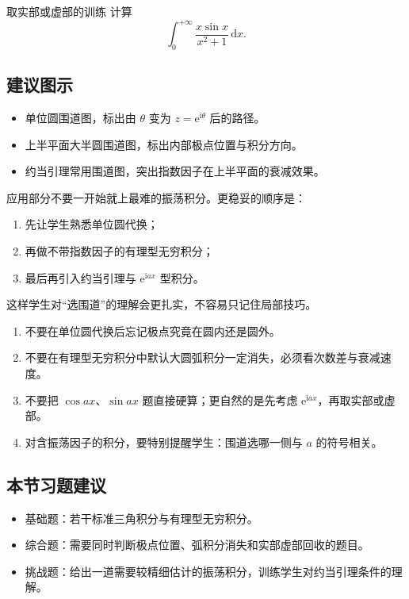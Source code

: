 \begin{lizi}{取实部或虚部的训练}{}
计算
\[
    \int_0^{+\infty}\frac{x\sin x}{x^2+1}\,\mathrm{d}x.
\]
\end{lizi}

\subsection*{建议图示}
\begin{itemize}
    \item 单位圆围道图，标出由 $\theta$ 变为 $z=\mathrm{e}^{\mathrm{i}\theta}$ 后的路径。
    \item 上半平面大半圆围道图，标出内部极点位置与积分方向。
    \item 约当引理常用围道图，突出指数因子在上半平面的衰减效果。
\end{itemize}

\begin{tishi}[这一节的教学节奏建议]
应用部分不要一开始就上最难的振荡积分。更稳妥的顺序是：
\begin{enumerate}
    \item 先让学生熟悉单位圆代换；
    \item 再做不带指数因子的有理型无穷积分；
    \item 最后再引入约当引理与 $\mathrm{e}^{\mathrm{i}ax}$ 型积分。
\end{enumerate}
这样学生对``选围道''的理解会更扎实，不容易只记住局部技巧。
\end{tishi}

\begin{jinshi}[本节易错点]
\begin{enumerate}
    \item 不要在单位圆代换后忘记极点究竟在圆内还是圆外。
    \item 不要在有理型无穷积分中默认大圆弧积分一定消失，必须看次数差与衰减速度。
    \item 不要把 $\cos ax$、$\sin ax$ 题直接硬算；更自然的是先考虑 $\mathrm{e}^{\mathrm{i}ax}$，再取实部或虚部。
    \item 对含振荡因子的积分，要特别提醒学生：围道选哪一侧与 $a$ 的符号相关。
\end{enumerate}
\end{jinshi}

\subsection*{本节习题建议}
\begin{itemize}
    \item 基础题：若干标准三角积分与有理型无穷积分。
    \item 综合题：需要同时判断极点位置、弧积分消失和实部虚部回收的题目。
    \item 挑战题：给出一道需要较精细估计的振荡积分，训练学生对约当引理条件的理解。
\end{itemize}

